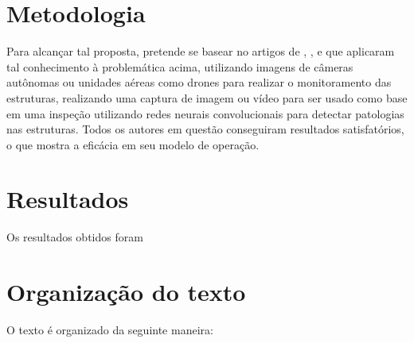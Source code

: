 \section{Metodologia}

Para alcançar tal proposta, pretende se basear no artigos de , ,  e  que aplicaram tal conhecimento à problemática acima, utilizando imagens de câmeras autônomas ou unidades aéreas como drones para realizar o monitoramento das estruturas, realizando uma captura de imagem ou vídeo para ser usado como base em uma inspeção utilizando redes neurais convolucionais para detectar patologias nas estruturas. Todos os autores em questão conseguiram resultados satisfatórios, o que mostra a eficácia em seu modelo de operação.

\section{Resultados}

Os resultados obtidos foram

\section{Organização do texto}

O texto é organizado da seguinte maneira: